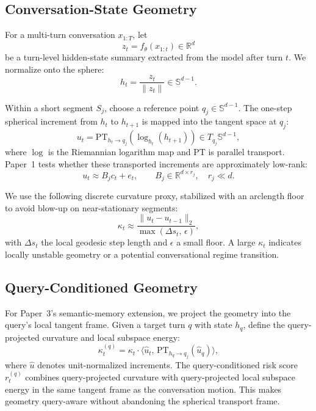 \documentclass[conference]{IEEEtran}
\newcommand{\R}{\mathbb{R}}
\newcommand{\Sph}{\mathbb{S}}
\begin{document}
\subsection{Conversation-State Geometry}
For a multi-turn conversation $x_{1:T}$, let
\begin{equation}
z_t = f_\theta(x_{1:t}) \in \R^d
\end{equation}
be a turn-level hidden-state summary extracted from the model after turn $t$. We normalize onto the sphere:
\begin{equation}
h_t = \frac{z_t}{\lVert z_t \rVert} \in \Sph^{d-1}.
\end{equation}

Within a short segment $S_j$, choose a reference point $q_j \in \Sph^{d-1}$. The one-step spherical increment from $h_t$ to $h_{t+1}$ is mapped into the tangent space at $q_j$:
\begin{equation}
u_t = \mathrm{PT}_{h_t \rightarrow q_j}\!\left(\log_{h_t}(h_{t+1})\right)
\in T_{q_j}\Sph^{d-1},
\end{equation}
where $\log$ is the Riemannian logarithm map and $\mathrm{PT}$ is parallel transport. Paper~1 tests whether these transported increments are approximately low-rank:
\begin{equation}
u_t \approx B_j c_t + e_t, \qquad B_j \in \R^{d \times r_j}, \quad r_j \ll d.
\end{equation}

We use the following discrete curvature proxy, stabilized with an arclength floor to avoid blow-up on near-stationary segments:
\begin{equation}
\kappa_t \approx \frac{\lVert u_t - u_{t-1} \rVert_2}{\max(\Delta s_t,\, \epsilon)},
\end{equation}
with $\Delta s_t$ the local geodesic step length and $\epsilon$ a small floor. A large $\kappa_t$ indicates locally unstable geometry or a potential conversational regime transition.

\subsection{Query-Conditioned Geometry}
For Paper~3's semantic-memory extension, we project the geometry into the query's local tangent frame. Given a target turn $q$ with state $h_q$, define the query-projected curvature and local subspace energy:
\begin{equation}
\kappa_t^{(q)} = \kappa_t \cdot \langle \hat{u}_t,\, \mathrm{PT}_{h_q \rightarrow q_j}(\hat{u}_q) \rangle,
\end{equation}
where $\hat{u}$ denotes unit-normalized increments. The query-conditioned risk score $r_t^{(q)}$ combines query-projected curvature with query-projected local subspace energy in the same tangent frame as the conversation motion. This makes geometry query-aware without abandoning the spherical transport frame.
\end{document}
